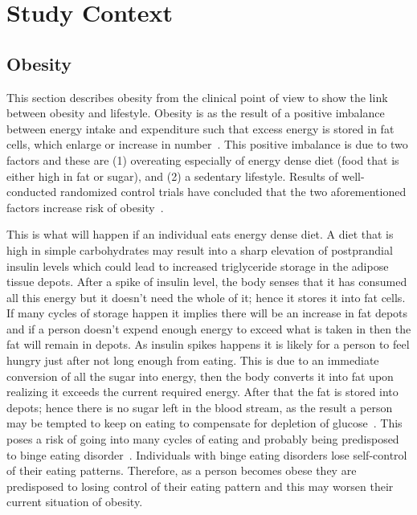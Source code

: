 
\chapter{Study Context} %

\label{contextchapter} %


\section{Obesity}
This section describes obesity from the clinical point of view to show the link between obesity and lifestyle. Obesity is as the  result of a positive imbalance between energy intake and expenditure such that excess energy is stored in fat cells, which enlarge or increase in number~\citep{steyn2006chronic}. This positive imbalance is due to two factors and these are (1) overeating especially of energy dense diet (food that is either high in fat or sugar), and (2) a sedentary lifestyle. Results of well-conducted randomized control trials have concluded that the two aforementioned factors increase risk of obesity~\citep{swinburn2004diet}.

This is what will happen if an individual eats energy dense diet. A diet that is high in simple carbohydrates may result into a sharp elevation  of postprandial insulin levels which could lead to increased triglyceride storage in the adipose tissue depots. After a spike of insulin level, the body senses that it has consumed all this energy but it doesn't need the whole of it; hence it stores it into fat cells. If many cycles of storage happen it implies there will be an increase in fat depots and if a person doesn't expend enough energy to exceed what is taken in then the fat will remain in depots. As insulin spikes happens it is likely for a person to feel hungry just after not long enough from eating. This is due to an immediate conversion of all the sugar into energy, then the body converts it into fat upon realizing it exceeds the current required energy. After that the fat is stored into depots; hence there is no sugar left in the blood stream, as the result a person may be tempted to keep on eating to compensate for depletion of glucose~\citep{bouchard1993exercise}. This poses a risk of going into many cycles of eating and probably being predisposed to binge eating disorder~\citep{collins2009behavioral}. Individuals with binge eating disorders lose self-control of their eating patterns. Therefore, as a person becomes obese they are predisposed to losing control of their eating pattern and this may worsen their current situation of obesity. 

